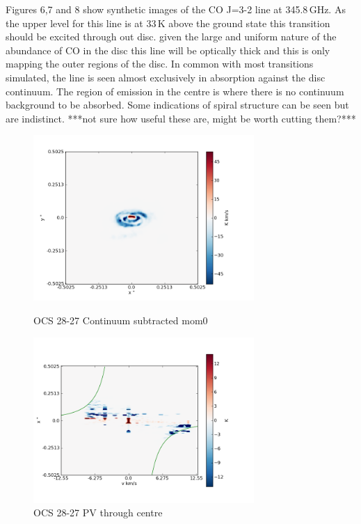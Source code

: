 \documentclass[useAMS,usenatbib]{mn2e}
\begin{document}
Figures 6,7 and 8 show synthetic images of the CO J=3-2 line at 345.8$\,$GHz. As the upper level for this line is at 33$\,$K above the ground state this transition should be excited through out disc. given the large and uniform nature of the abundance of CO in the disc this line will be optically thick and this is only mapping the outer regions of the disc. In common with most transitions simulated, the line is seen almost exclusively in absorption against the disc continuum. The region of emission in the centre is where there is no continuum background to be absorbed.  Some indications of spiral structure can be seen but are indistinct. ***not sure how useful these are, might be worth cutting them?***\newline



\begin{figure}
 \includegraphics[width=84mm]{Figures/sim/imageOCS_28-27_30deg_composite_contSub.png}
 \label{OCS_mom0}
 \caption{OCS 28-27 Continuum subtracted mom0}
\end{figure}

\begin{figure}
 \includegraphics[width=84mm]{Figures/sim/imageOCS_28-27_30deg_composite_PV_centre.png}

 \caption{OCS 28-27 PV through centre}
\end{figure}
\end{document}
